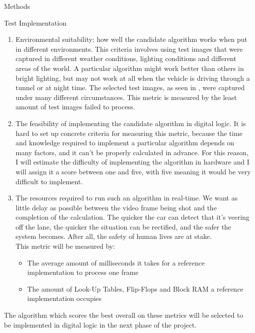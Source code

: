 \documentclass{matthijs}
\begin{document}
\begin{hoofdstuk}{Methods}
\begin{paragraaf}{Test Implementation}
\begin{enumerate}
				\item	Environmental suitability; how well the candidate algorithm works when put in different environments.
					This criteria involves using test images that were captured in different weather conditions, lighting conditions and different areas of the world.
					A particular algorithm might work better than others in bright lighting, but may not work at all when the vehicle is driving through a tunnel or at night time.
					The selected test images, as seen in , were captured under many different circumstances.
					This metric is measured by the least amount of test images failed to process.

				\item	The feasibility of implementing the candidate algorithm in digital logic.
					It is hard to set up concrete criteria for measuring this metric, because the time and knowledge required to implement a particular algorithm depends on many factors, and it can't be properly calculated in advance.
					For this reason, I will estimate the difficulty of implementing the algorithm in hardware and I will assign it a score between one and five, with five meaning it would be very difficult to implement.

				\item	The resources required to run such an algorithm in real-time.
					We want as little delay as possible between the video frame being shot and the completion of the calculation.
					The quicker the car can detect that it's veering off the lane, the quicker the situation can be rectified, and the safer the system becomes.
					After all, the safety of human lives are at stake.\\
					This metric will be measured by:

					\begin{itemize}

						\item	The average amount of milliseconds it takes for a reference implementation to process one frame
						
						\item	The amount of Look-Up Tables, Flip-Flops and Block RAM a reference implementation occupies

					\end{itemize}

			\end{enumerate}

			The algorithm which scores the best overall on these metrics will be selected to be implemented in digital logic in the next phase of the project.
		\end{paragraaf}


\end{hoofdstuk}
\end{document}

